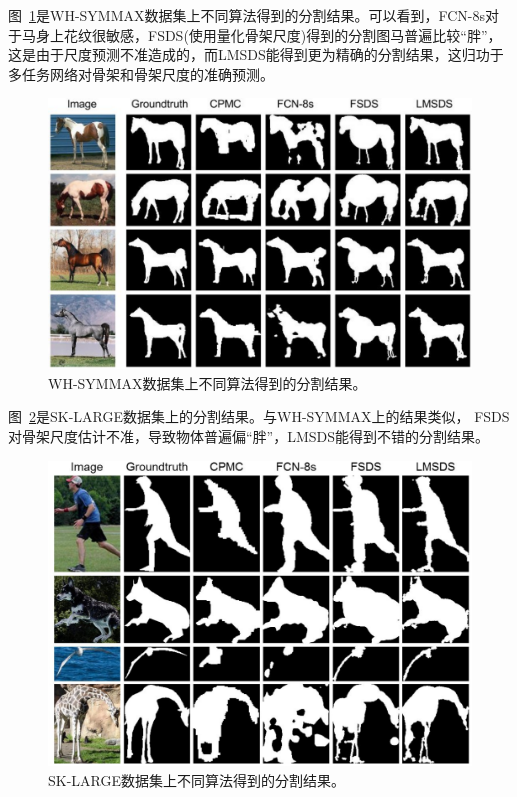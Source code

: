 \documentclass[UTF8]{ctexart}
\numberwithin{equation}{section} %
\numberwithin{table}{section} %
\begin{document}
图~\ref{fig:seg_wh}是WH-SYMMAX数据集上不同算法得到的分割结果。可以看到，FCN-8s对于马身上花纹很敏感，FSDS(使用量化骨架尺度)得到的分割图马普遍比较“胖”，这是由于尺度预测不准造成的，而LMSDS能得到更为精确的分割结果，这归功于
多任务网络对骨架和骨架尺度的准确预测。
\begin{figure}[H]
\centering
\includegraphics[scale=0.3]{figures/seg_wh.png}
\caption{WH-SYMMAX数据集上不同算法得到的分割结果。}
\label{fig:seg_wh}
\end{figure}
图~\ref{fig:seg_skl}是SK-LARGE数据集上的分割结果。与WH-SYMMAX上的结果类似， FSDS 对骨架尺度估计不准，导致物体普遍偏“胖”，LMSDS能得到不错的分割结果。
\begin{figure}[H]
\centering
\includegraphics[scale=0.3]{figures/seg_skl.png}
\caption{SK-LARGE数据集上不同算法得到的分割结果。}
\label{fig:seg_skl}
\end{figure}
\end{document}
